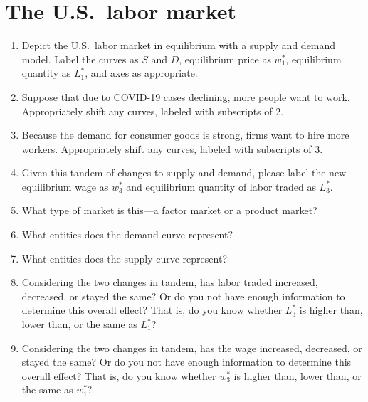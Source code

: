 \documentclass{assignment}
\begin{document}
\section{The U.S.~labor market}

\begin{center}
\vspace{18pt}
\end{center}

\begin{enumerate}

\item Depict the U.S.~labor market in equilibrium with a supply and demand model. Label the curves as $S$ and $D$, equilibrium price as $w^*_1$, equilibrium quantity as $L^*_1$, and axes as appropriate.

\item Suppose that due to COVID-19 cases declining, more people want to work. Appropriately shift any curves, labeled with subscripts of 2.

\item Because the demand for consumer goods is strong, firms want to hire more workers. Appropriately shift any curves, labeled with subscripts of 3.

\item Given this tandem of changes to supply and demand, please label the new equilibrium wage as $w^*_3$ and equilibrium quantity of labor traded as $L^*_3$.

\clearpage

\item What type of market is this---a factor market or a product market?

\vfill

\item What entities does the demand curve represent?

\vfill

\item What entities does the supply curve represent?

\vfill

\item Considering the two changes in tandem, has labor traded increased, decreased, or stayed the same? Or do you not have enough information to determine this overall effect? That is, do you know whether $L^*_3$ is higher than, lower than, or the same as $L^*_1$?

\vfill

\item Considering the two changes in tandem, has the wage increased, decreased, or stayed the same? Or do you not have enough information to determine this overall effect? That is, do you know whether $w^*_3$ is higher than, lower than, or the same as $w^*_1$?

\vfill

\end{enumerate}
\end{document}
